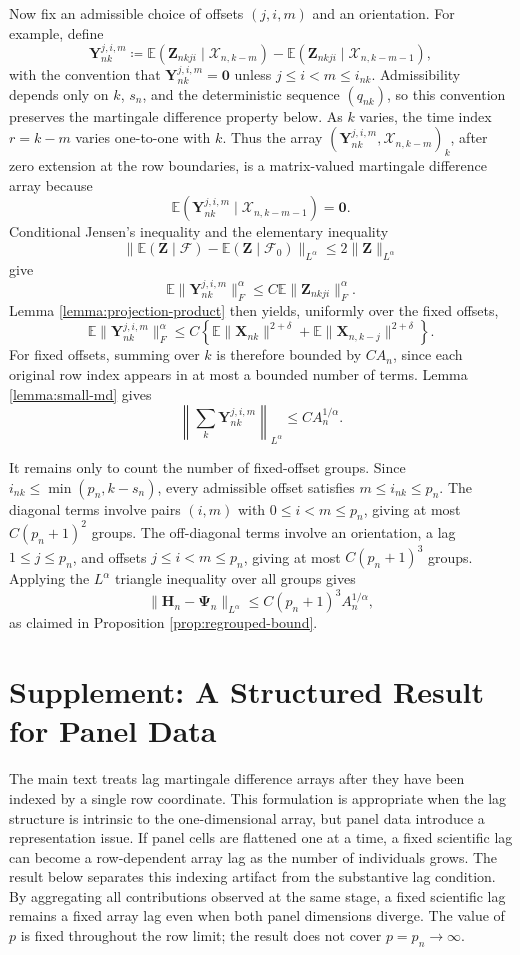 \documentclass[11pt]{article}
\renewcommand\vec[1]{\boldsymbol{#1}}
\newcommand\mat[1]{\mathbf{#1}}
\newcommand{\E}{\mathbb{E}}
\newcommand{\X}{\mathcal{X}}
\theoremstyle{definition}
\begin{document}
Now fix an admissible choice of offsets \((j,i,m)\) and an orientation.
For example, define
\[
\mat Y_{nk}^{j,i,m}
\coloneqq
\E(\mat Z_{nkji}\mid\X_{n,k-m})
-
\E(\mat Z_{nkji}\mid\X_{n,k-m-1}),
\]
with the convention that \(\mat Y_{nk}^{j,i,m}=\mat 0\) unless \(j\leq i<m\leq i_{nk}\).
Admissibility depends only on \(k\), \(s_n\), and the deterministic sequence \((q_{nk})\), so this convention preserves the martingale difference property below.
As \(k\) varies, the time index \(r=k-m\) varies one-to-one with \(k\).
Thus the array \((\mat Y_{nk}^{j,i,m},\X_{n,k-m})_k\), after zero extension at the row boundaries, is a matrix-valued martingale difference array because
\[
\E(\mat Y_{nk}^{j,i,m}\mid\X_{n,k-m-1})=\mat0.
\]
Conditional Jensen's inequality and the elementary inequality
\[
\| \E(\mat Z\mid\mathcal F)-\E(\mat Z\mid\mathcal F_0)\|_{L^\alpha}
\leq
2\|\mat Z\|_{L^\alpha}
\]
give
\[
\E\|\mat Y_{nk}^{j,i,m}\|_F^\alpha
\leq
C\E\|\mat Z_{nkji}\|_F^\alpha.
\]
Lemma \ref{lemma:projection-product} then yields, uniformly over the fixed offsets,
\[
\E\|\mat Y_{nk}^{j,i,m}\|_F^\alpha
\leq
C\left\{
\E\|\vec X_{nk}\|^{2+\delta}
+
\E\|\vec X_{n,k-j}\|^{2+\delta}
\right\}.
\]
For fixed offsets, summing over \(k\) is therefore bounded by \(CA_n\), since each original row index appears in at most a bounded number of terms.
Lemma \ref{lemma:small-md} gives
\[
\left\|\sum_k\mat Y_{nk}^{j,i,m}\right\|_{L^\alpha}
\leq
CA_n^{1/\alpha}.
\]

It remains only to count the number of fixed-offset groups.
Since \(i_{nk}\leq\min(p_n,k-s_n)\), every admissible offset satisfies \(m\leq i_{nk}\leq p_n\).
The diagonal terms involve pairs \((i,m)\) with \(0\leq i<m\leq p_n\), giving at most \(C(p_n+1)^2\) groups.
The off-diagonal terms involve an orientation, a lag \(1\leq j\leq p_n\), and offsets \(j\leq i<m\leq p_n\), giving at most \(C(p_n+1)^3\) groups.
Applying the \(L^\alpha\) triangle inequality over all groups gives
\[
\|\mat H_n-\mat\Psi_n\|_{L^\alpha}
\leq
C(p_n+1)^3A_n^{1/\alpha},
\]
as claimed in Proposition \ref{prop:regrouped-bound}.

\section{Supplement: A Structured Result for Panel Data}\label{sec:structured-panel}

The main text treats lag martingale difference arrays after they have been indexed by a single row coordinate.
This formulation is appropriate when the lag structure is intrinsic to the one-dimensional array, but panel data introduce a representation issue.
If panel cells are flattened one at a time, a fixed scientific lag can become a row-dependent array lag as the number of individuals grows.
The result below separates this indexing artifact from the substantive lag condition.
By aggregating all contributions observed at the same stage, a fixed scientific lag remains a fixed array lag even when both panel dimensions diverge.
The value of \(p\) is fixed throughout the row limit; the result does not cover \(p=p_n\to\infty\).
\end{document}
